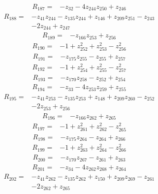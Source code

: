 \begin{align*}
R_{187}={}&-z_{32}-4z_{244}z_{250}+z_{246}
\end{align*}
\begin{align*}
R_{188}={}&-z_{41}z_{244}-z_{135}z_{244}+z_{146}+z_{209}z_{251}-z_{243}\\
&-2z_{244}+z_{247}
\end{align*}
\begin{align*}
R_{189}={}&-z_{166}z_{253}+z_{256}
\end{align*}
\begin{align*}
R_{190}={}&-1+z_{252}^{2}+z_{253}^{2}-z_{256}^{2}
\end{align*}
\begin{align*}
R_{191}={}&-z_{175}z_{255}-z_{255}+z_{257}
\end{align*}
\begin{align*}
R_{192}={}&-1+z_{254}^{2}+z_{255}^{2}-z_{257}^{2}
\end{align*}
\begin{align*}
R_{193}={}&-z_{170}z_{258}-z_{252}+z_{254}
\end{align*}
\begin{align*}
R_{194}={}&-z_{33}-4z_{253}z_{259}+z_{255}
\end{align*}
\begin{align*}
R_{195}={}&-z_{41}z_{253}-z_{135}z_{253}+z_{148}+z_{209}z_{260}-z_{252}\\
&-2z_{253}+z_{256}
\end{align*}
\begin{align*}
R_{196}={}&-z_{166}z_{262}+z_{265}
\end{align*}
\begin{align*}
R_{197}={}&-1+z_{261}^{2}+z_{262}^{2}-z_{265}^{2}
\end{align*}
\begin{align*}
R_{198}={}&-z_{175}z_{264}-z_{264}+z_{266}
\end{align*}
\begin{align*}
R_{199}={}&-1+z_{263}^{2}+z_{264}^{2}-z_{266}^{2}
\end{align*}
\begin{align*}
R_{200}={}&-z_{170}z_{267}-z_{261}+z_{263}
\end{align*}
\begin{align*}
R_{201}={}&-z_{34}-4z_{262}z_{268}+z_{264}
\end{align*}
\begin{align*}
R_{202}={}&-z_{41}z_{262}-z_{135}z_{262}+z_{150}+z_{209}z_{269}-z_{261}\\
&-2z_{262}+z_{265}
\end{align*}
